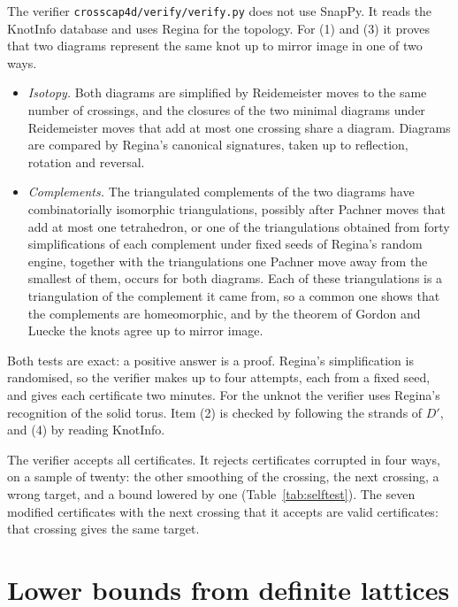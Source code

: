 \documentclass[11pt]{amsart}
\theoremstyle{definition}
\theoremstyle{remark}
\numberwithin{equation}{section}
\begin{document}
The verifier \texttt{crosscap4d/verify/verify.py} does not use SnapPy. It reads the KnotInfo
database and uses Regina \cite{Regina} for the topology. For (1) and (3) it proves that two
diagrams represent the same knot up to mirror image in one of two ways.
\begin{itemize}
\item \emph{Isotopy.} Both diagrams are simplified by Reidemeister moves to the same number
of crossings, and the closures of the two minimal diagrams under Reidemeister moves that add
at most one crossing share a diagram. Diagrams are compared by Regina's canonical
signatures, taken up to reflection, rotation and reversal.
\item \emph{Complements.} The triangulated complements of the two diagrams have
combinatorially isomorphic triangulations, possibly after Pachner moves that add at most one
tetrahedron, or one of the triangulations obtained from forty simplifications of each
complement under fixed seeds of Regina's random engine, together with the triangulations one
Pachner move away from the smallest of them, occurs for both diagrams. Each of these
triangulations is a triangulation of the complement it came from, so a common one shows that
the complements are homeomorphic, and by the theorem of Gordon and Luecke \cite{GL} the
knots agree up to mirror image.
\end{itemize}
Both tests are exact: a positive answer is a proof. Regina's simplification is randomised,
so the verifier makes up to four attempts, each from a fixed seed, and gives each
certificate two minutes. For the unknot the verifier uses Regina's recognition of the solid
torus. Item (2) is checked by following the strands of $D'$, and (4) by reading KnotInfo.

The verifier accepts all \ncerts{} certificates. It rejects certificates corrupted in four
ways, on a sample of twenty: the other smoothing of the crossing, the next crossing, a wrong
target, and a bound lowered by one (Table~\ref{tab:selftest}). The seven modified
certificates with the next crossing that it accepts are valid certificates: that crossing
gives the same target.

\begin{table}[htbp]
\centering
\selftesttable
\caption{Corrupted pinch certificates rejected by the verifier.}
\label{tab:selftest}
\end{table}

\section{Lower bounds from definite lattices}\label{sec:lower}
\end{document}
